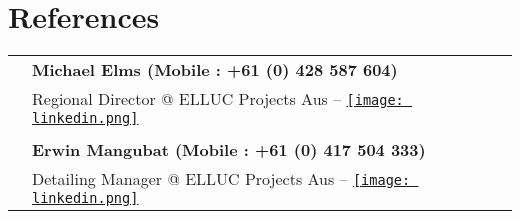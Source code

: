 \documentclass[10pt]{article}
\begin{document}


\section*{References}
\begin{tabular}{ p{2cm}|p{15cm} }
    & \textbf{Michael Elms (Mobile : +61 (0) 428 587 604)} \\
    &    \qquad Regional Director @ ELLUC Projects Aus -- 
        \href{https://au.linkedin.com/in/michaeltroyelms}{\texttt{[image: linkedin.png]}} \\ \\
    & \textbf{Erwin Mangubat (Mobile : +61 (0) 417 504 333)} \\
    &    \qquad Detailing Manager @ ELLUC Projects Aus -- 
        \href{https://au.linkedin.com/in/erwinmangubat}{\texttt{[image: linkedin.png]}} \\
\end{tabular}
\end{document}
